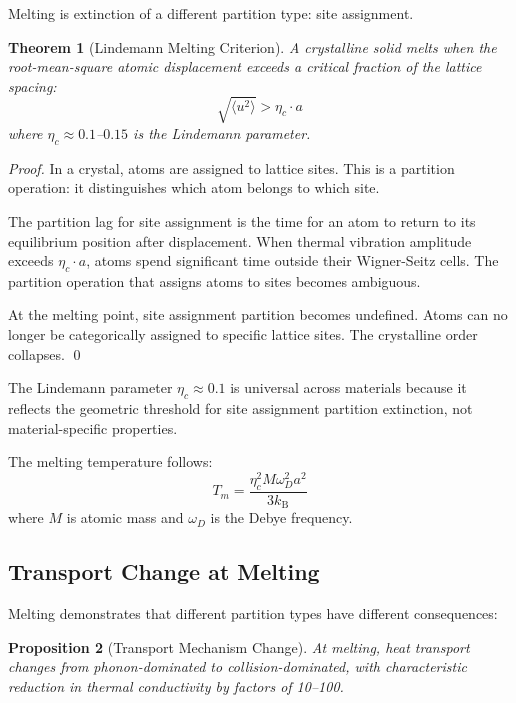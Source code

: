 \documentclass[twocolumn,10pt,aps,prd,superscriptaddress,nofootinbib]{revtex4-2}
\newtheorem{theorem}{Theorem}[section]
\newtheorem{proposition}[theorem]{Proposition}
\theoremstyle{remark}
\newcommand{\kB}{k_{\mathrm{B}}}
\begin{document}
Melting is extinction of a different partition type: site assignment.

\begin{theorem}[Lindemann Melting Criterion]
\label{thm:lindemann}
A crystalline solid melts when the root-mean-square atomic displacement exceeds a critical fraction of the lattice spacing:
\begin{equation}
\sqrt{\langle u^2 \rangle} > \eta_c \cdot a
\label{eq:lindemann}
\end{equation}
where $\eta_c \approx 0.1$--$0.15$ is the Lindemann parameter.
\end{theorem}

\begin{proof}
In a crystal, atoms are assigned to lattice sites. This is a partition operation: it distinguishes which atom belongs to which site.

The partition lag for site assignment is the time for an atom to return to its equilibrium position after displacement. When thermal vibration amplitude exceeds $\eta_c \cdot a$, atoms spend significant time outside their Wigner-Seitz cells. The partition operation that assigns atoms to sites becomes ambiguous.

At the melting point, site assignment partition becomes undefined. Atoms can no longer be categorically assigned to specific lattice sites. The crystalline order collapses. \qed
\end{proof}

The Lindemann parameter $\eta_c \approx 0.1$ is universal across materials because it reflects the geometric threshold for site assignment partition extinction, not material-specific properties.

The melting temperature follows:
\begin{equation}
T_m = \frac{\eta_c^2 M \omega_D^2 a^2}{3\kB}
\label{eq:melting_temperature}
\end{equation}
where $M$ is atomic mass and $\omega_D$ is the Debye frequency.

\subsection{Transport Change at Melting}

Melting demonstrates that different partition types have different consequences:

\begin{proposition}[Transport Mechanism Change]
\label{prop:transport_change}
At melting, heat transport changes from phonon-dominated to collision-dominated, with characteristic reduction in thermal conductivity by factors of 10--100.
\end{proposition}
\end{document}
